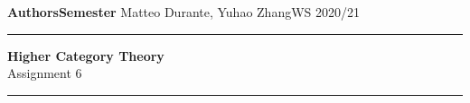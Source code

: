 \documentclass[a4paper,11pt,openany]{scrartcl}
\begin{document}
\noindent\textbf{Authors}\hfill\textbf{Semester} \linebreak
\vspace*{-.1cm} Matteo Durante, Yuhao Zhang\hfill WS 2020/21 \\

\noindent
\rule{\linewidth}{1pt}
\begin{center}
\Large
\textbf{Higher Category Theory} \\
Assignment 6
\end{center}
\rule{\linewidth}{1pt}
\\


\newcommand{\La}{\Lambda}
\newcommand{\pa}{\partial}
\newcommand{\ob}{\operatorname{Ob}}
\newcommand{\mor}{\operatorname{Mor}}
\newcommand{\sto}{\twoheadrightarrow}

\newcommand{\plim}{\varprojlim}
\newcommand{\sst}{\subseteq}
\newcommand{\eq}{\operatorname{eq}}

\newcommand{\f}{\varphi}
\end{document}
